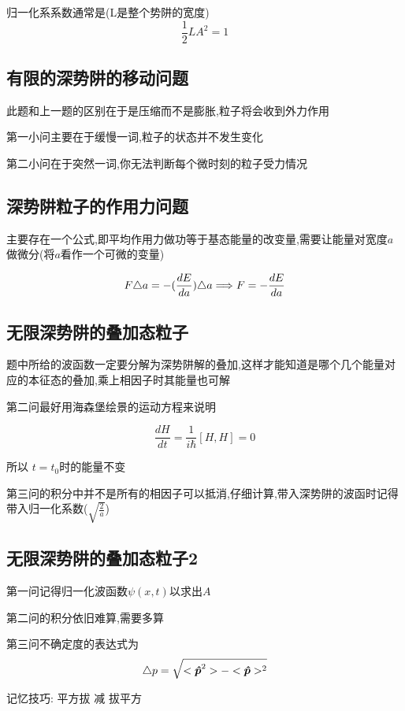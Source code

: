 \documentclass{article}
\begin{document}
            归一化系系数通常是(L是整个势阱的宽度)
            $$ \frac{1}{2} L A^{2}  = 1 $$

        \subsection{有限的深势阱的移动问题}
            此题和上一题的区别在于是压缩而不是膨胀,粒子将会收到外力作用
            
            第一小问主要在于缓慢一词,粒子的状态并不发生变化
            
            第二小问在于突然一词,你无法判断每个微时刻的粒子受力情况

        \subsection{深势阱粒子的作用力问题}
            主要存在一个公式,即平均作用力做功等于基态能量的改变量,需要让能量对宽度$a$做微分(将$a$看作一个可微的变量)

            $$ F\triangle{a} = -(\frac{dE}{da}) \triangle{a} \Longrightarrow F = -\frac{dE}{da} $$


        \subsection{无限深势阱的叠加态粒子}
            题中所给的波函数一定要分解为深势阱解的叠加,这样才能知道是哪个几个能量对应的本征态的叠加,乘上相因子时其能量也可解

            第二问最好用海森堡绘景的运动方程来说明

            $$ \frac{dH}{dt}  = \frac{1}{i\hbar} [H,H] = 0 $$
            
            所以 $ t = t_{0} $时的能量不变

            第三问的积分中并不是所有的相因子可以抵消,仔细计算,带入深势阱的波函时记得带入归一化系数($\sqrt{\frac{2}{a}}$)
            

        \subsection{无限深势阱的叠加态粒子2}
            第一问记得归一化波函数$\psi(x,t)$以求出$A$
            
            第二问的积分依旧难算,需要多算

            第三问不确定度的表达式为
            $$ \triangle{p} = \sqrt{<\vu*{p}^{2}> - <\vu*{p}>^{2} } $$

            记忆技巧: 平方拔 减 拔平方
\end{document}
